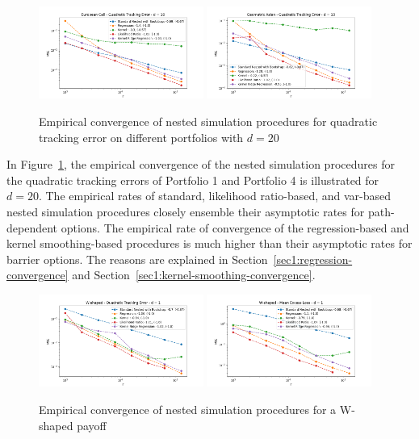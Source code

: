 \begin{figure}[ht!] 
    \centering
    \includegraphics[width=0.48\textwidth]{./project1/figures/figure6a.png}
    \includegraphics[width=0.48\textwidth]{./project1/figures/figure6b.png}
    \caption{Empirical convergence of nested simulation procedures for quadratic tracking error on different portfolios with $d=20$}
\label{fig1:1x03} 
\end{figure}

In Figure~\ref{fig1:1x03}, the empirical convergence of the nested simulation procedures for the quadratic tracking errors of Portfolio 1 and Portfolio 4 is illustrated for $d = 20$.
The empirical rates of standard, likelihood ratio-based, and \gls{var}-based nested simulation procedures closely ensemble their asymptotic rates for path-dependent options.
The empirical rate of convergence of the regression-based and kernel smoothing-based procedures is much higher than their asymptotic rates for barrier options. 
The reasons are explained in Section~\ref{sec1:regression-convergence} and Section~\ref{sec1:kernel-smoothing-convergence}.

\begin{figure}[ht!] 
    \centering
    \includegraphics[width=0.48\textwidth]{./project1/figures/figure7a.png}
    \includegraphics[width=0.48\textwidth]{./project1/figures/figure7b.png}
    \caption{Empirical convergence of nested simulation procedures for a W-shaped payoff}
\label{fig1:5503} 
\end{figure}

